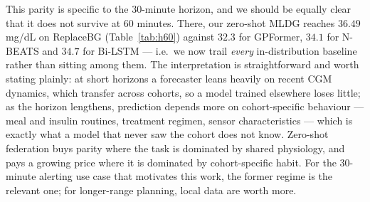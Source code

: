 \documentclass[10pt,letterpaper]{article}
\begin{document}
This parity is specific to the 30-minute horizon, and we should be equally clear
that it does not survive at 60 minutes. There, our zero-shot MLDG reaches $36.49$
mg/dL on ReplaceBG (Table~\ref{tab:h60}) against $32.3$ for GPFormer, $34.1$ for
N-BEATS and $34.7$ for Bi-LSTM \cite{zhu2024gpformer} --- i.e.\ we now trail
\emph{every} in-distribution baseline rather than sitting among them. The
interpretation is straightforward and worth stating plainly: at short horizons a
forecaster leans heavily on recent CGM dynamics, which transfer across cohorts, so
a model trained elsewhere loses little; as the horizon lengthens, prediction
depends more on cohort-specific behaviour --- meal and insulin routines,
treatment regimen, sensor characteristics --- which is exactly what a model that
never saw the cohort does not know. Zero-shot federation buys parity where the
task is dominated by shared physiology, and pays a growing price where it is
dominated by cohort-specific habit. For the 30-minute alerting use case that
motivates this work, the former regime is the relevant one; for longer-range
planning, local data are worth more.
\end{document}

